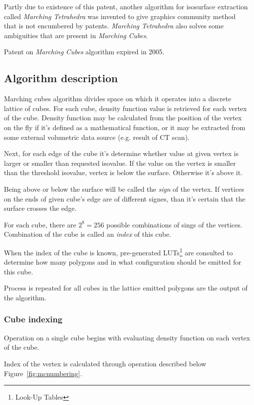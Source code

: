 Partly due to existence of this patent, another algorithm for isosurface
extraction called \emph{Marching Tetrahedra} was invented to give graphics
community method that is not encumbered by patents. \emph{Marching Tetrahedra}
also solves some ambiguities that are present in \emph{Marching Cubes}.

Patent on \emph{Marching Cubes} algorithm expired in 2005.

\subsection{Algorithm description \parencite{Lorensen:1987:MCH:37402.37422}}

Marching cubes algorithm divides space on which it operates into a discrete
lattice of cubes. For each cube, density function value is retrieved for each
vertex of the cube. Density function may be calculated from the position of the
vertex on the fly if it's defined as a mathematical function, or it may be
extracted from some external volumetric data source (e.g. result of CT scan).

Next, for each edge of the cube it's determine whether value at given vertex is
larger or smaller than requested isovalue. If the value on the vertex is smaller
than the threshold isovalue, vertex is below the surface. Otherwise it's above
it.

Being above or below the surface will be called the \emph{sign} of the vertex.
If vertices on the ends of given cube's edge are of different signes, than it's
certain that the surface crosses the edge.

For each cube, there are $2^8=256$ possible combinations of sings of the
vertices. Combination of the cube is called an \emph{index} of this cube.

When the index of the cube is known, pre-generated LUTs\footnote{Look-Up Tables}
are consulted to determine how many polygons and in what configuration should be
emitted for this cube.

Process is repeated for all cubes in the lattice emitted polygons are the output
of the algorithm.

\subsubsection{Cube indexing}

Operation on a single cube begins with evaluating density function on each
vertex of the cube.

Index of the vertex is calculated through operation described below
Figure~\ref{fig:mcnumbering}.

